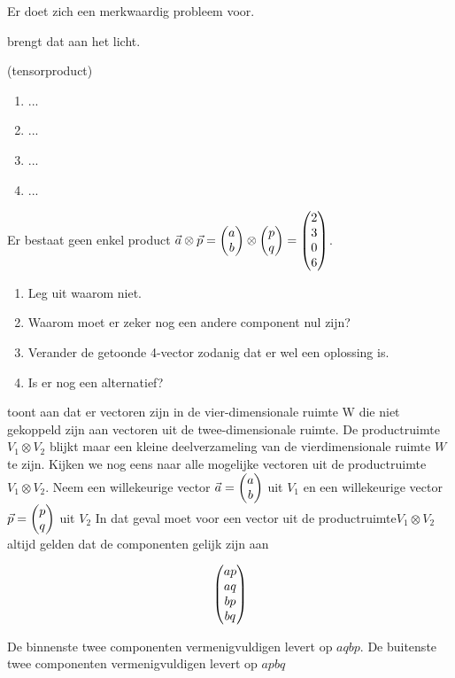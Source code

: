 \documentclass[../main.tex]{subfiles}
\begin{document}
\begin{mdframed}[style=wiskader,frametitle={Matrixen}]
Er doet zich een merkwaardig probleem voor.

 brengt dat aan het licht. 

\begin{antwoord}
(tensorproduct)
\begin{enumerate}
  \item $...$
  \item $...$
  \item $...$
  \item $...$
\end{enumerate}
\end{antwoord}
\begin{opdracht}
Er bestaat geen enkel product $\vect{a} \otimes \vect{p} =\mqty(a\\b) \otimes \mqty(p\\q)= \mqty(2\\3\\0\\6)$. 
\begin{enumerate}
\item Leg uit waarom niet. 
\item Waarom moet er zeker nog een andere component nul zijn?
\item Verander de getoonde 4-vector zodanig dat er wel een oplossing is.
\item Is er nog een alternatief?
\end{enumerate}
\end{opdracht}
 
 toont aan dat er vectoren zijn in de vier-dimensionale ruimte W die niet gekoppeld zijn aan vectoren uit de twee-dimensionale ruimte. De productruimte $V_1 \otimes V_2$ blijkt maar een kleine deelverzameling van de vierdimensionale ruimte $W$ te zijn.
Kijken we nog eens naar alle mogelijke vectoren uit de productruimte $V_1 \otimes V_2$.
Neem een willekeurige vector $\vect{a} = \mqty(a\\b)$ uit $V_1$ en een willekeurige vector$\vect{p} = \mqty(p\\q)$ uit $V_2$ In dat geval moet voor een vector uit de productruimte$V_1 \otimes V_2$ altijd gelden dat de componenten gelijk zijn aan 


\[ \mqty(ap\\aq\\bp\\bq)\]

De binnenste twee componenten vermenigvuldigen levert op $aqbp$. 
De buitenste twee componenten vermenigvuldigen levert op $apbq$


\end{mdframed}
\end{document}
